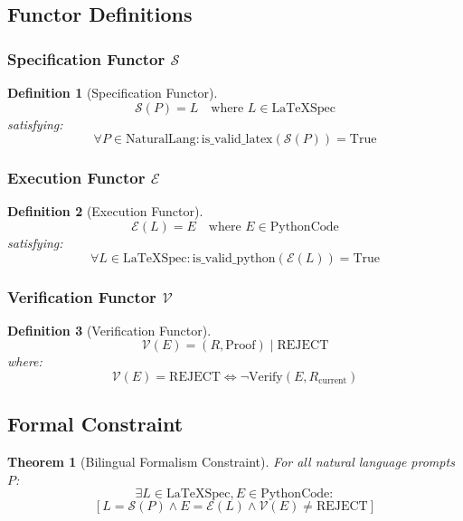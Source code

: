 \documentclass[12pt]{article}
\newtheorem{theorem}{Theorem}
\newtheorem{definition}{Definition}
\begin{document}
\subsection{Functor Definitions}

\subsubsection{Specification Functor $\mathcal{S}$}

\begin{definition}[Specification Functor]
\[
\mathcal{S}(P) = L \quad \text{where } L \in \text{LaTeXSpec}
\]
satisfying:
\[
\forall P \in \text{NaturalLang}: \text{is\_valid\_latex}(\mathcal{S}(P)) = \text{True}
\]
\end{definition}

\subsubsection{Execution Functor $\mathcal{E}$}

\begin{definition}[Execution Functor]
\[
\mathcal{E}(L) = E \quad \text{where } E \in \text{PythonCode}
\]
satisfying:
\[
\forall L \in \text{LaTeXSpec}: \text{is\_valid\_python}(\mathcal{E}(L)) = \text{True}
\]
\end{definition}

\subsubsection{Verification Functor $\mathcal{V}$}

\begin{definition}[Verification Functor]
\[
\mathcal{V}(E) = (R, \text{Proof}) \mid \text{REJECT}
\]
where:
\[
\mathcal{V}(E) = \text{REJECT} \iff \neg \text{Verify}(E, R_{\text{current}})
\]
\end{definition}

\subsection{Formal Constraint}

\begin{theorem}[Bilingual Formalism Constraint]
For all natural language prompts $P$:
\[
\exists L \in \text{LaTeXSpec}, E \in \text{PythonCode}:
\]
\[
[L = \mathcal{S}(P) \land E = \mathcal{E}(L) \land \mathcal{V}(E) \neq \text{REJECT}]
\]
\end{theorem}
\end{document}
